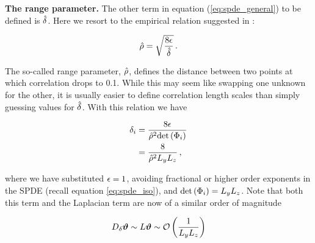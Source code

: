 \noindent\textbf{The range parameter.}
The other term in equation (\ref{eq:spde_general}) to be defined is $\hat{\delta}$.
Here we resort to the empirical relation suggested in
\citet{RSSB:RSSB777}:
\begin{linenomath*}\begin{equation*}
    \hat{\rho} = \sqrt{\dfrac{8\epsilon}{\hat{\delta}}} \, .
\end{equation*}\end{linenomath*}
The so-called range parameter, $\hat{\rho}$, defines the
distance between two points at which correlation drops to 0.1.
While this may seem like swapping one unknown for the other, it is usually easier to
define correlation length scales than simply guessing values for $\hat{\delta}$.
With this relation we have
\begin{linenomath*}\begin{equation*}
    \begin{aligned}
        \delta_i &= \dfrac{8\epsilon}{\hat{\rho}^2\text{det}\left(\Phi_{i}\right)} \\
                 &= \dfrac{8}{\hat{\rho}^2 L_y L_z} \, ,
    \end{aligned}
\end{equation*}\end{linenomath*}
where we have substituted $\epsilon=1$, avoiding fractional or higher order exponents
in the SPDE (recall equation \eqref{eq:spde_iso}), and $\text{det}\left(\Phi_{i}\right) = L_yL_z$.
Note that both this term and the Laplacian term are now of a similar order of
magnitude
\begin{linenomath*}\begin{equation*}
    D_{\delta}\bm{\vartheta} \sim L\bm{\vartheta} \sim \mathcal{O}\left(\dfrac{1}{L_y L_z}\right)
\end{equation*}\end{linenomath*}
\\

